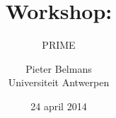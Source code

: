\documentclass[]{beamer}
\title{Workshop: \TikZ}
\subtitle{PRIME}
\author{Pieter Belmans \\ Universiteit Antwerpen}
\date{24 april 2014}
\begin{document}
\begin{frame}
  \titlepage
\end{frame}










\end{document}
